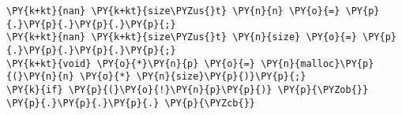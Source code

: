 \begin{Verbatim}[commandchars=\\\{\},codes={\catcode`\$=3\catcode`\^=7\catcode`\_=8}]
\PY{k+kt}{nan} \PY{k+kt}{size\PYZus{}t} \PY{n}{n} \PY{o}{=} \PY{p}{.}\PY{p}{.}\PY{p}{.}\PY{p}{;}
\PY{k+kt}{nan} \PY{k+kt}{size\PYZus{}t} \PY{n}{size} \PY{o}{=} \PY{p}{.}\PY{p}{.}\PY{p}{.}\PY{p}{;}
\PY{k+kt}{void} \PY{o}{*}\PY{n}{p} \PY{o}{=} \PY{n}{malloc}\PY{p}{(}\PY{n}{n} \PY{o}{*} \PY{n}{size}\PY{p}{)}\PY{p}{;}
\PY{k}{if} \PY{p}{(}\PY{o}{!}\PY{n}{p}\PY{p}{)} \PY{p}{\PYZob{}} \PY{p}{.}\PY{p}{.}\PY{p}{.} \PY{p}{\PYZcb{}}
\end{Verbatim}
